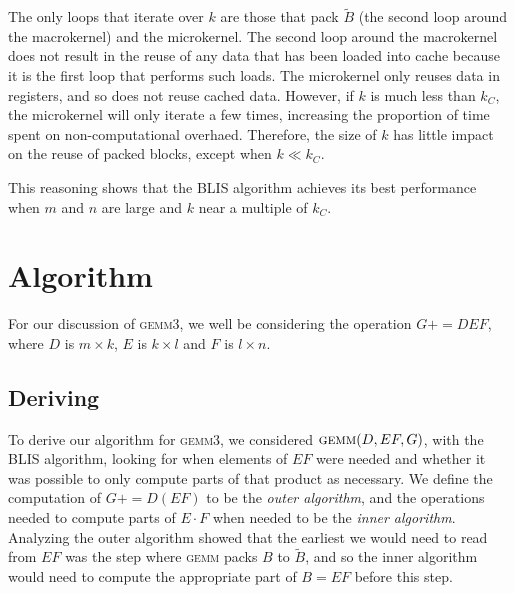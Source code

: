 \documentclass[12pt]{article}
\newcommand*{\pluseq}{\mathrel{{+}{=}}}
\newcommand*{\gemmt}{{\textsc{gemm3}}}
\newcommand*{\gemm}{{\textsc{gemm}}}
\begin{document}
The only loops that iterate over $k$ are those that pack $\widetilde{B}$ (the second loop around the macrokernel) and the microkernel.
The second loop around the macrokernel does not result in the reuse of any data that has been loaded into cache because it is the first loop that performs such loads.
The microkernel only reuses data in registers, and so does not reuse cached data.
However, if $k$ is much less than $k_C$, the microkernel will only iterate a few times, increasing the proportion of time spent on non-computational overhaed.
Therefore, the size of $k$ has little impact on the reuse of packed blocks, except when $k \ll k_C$.

This reasoning shows that the BLIS algorithm achieves its best performance when $m$ and $n$ are large and $k$ near a multiple of $k_C$.

\section{Algorithm}
For our discussion of \gemmt{}, we well be considering the operation $G \pluseq DEF$, where $D$ is $m \times k$, $E$ is $k \times l$ and $F$ is $l \times n$.

\subsection{Deriving {\cmunicode \gemmt{}}}
To derive our algorithm for \gemmt{}, we considered $\gemm{}(D, EF, G)$, with the BLIS algorithm, looking for when elements of $EF$ were needed and whether it was possible to only compute parts of that product as necessary.
We define the computation of $G \pluseq D(EF)$ to be the \emph{outer algorithm}, and the operations needed to compute parts of $E \cdot F$ when needed to be the \emph{inner algorithm}.
Analyzing the outer algorithm showed that the earliest we would need to read from $EF$ was the step where \gemm{} packs $B$ to $\widetilde{B}$, and so the inner algorithm would need to compute the appropriate part of $B = EF$ before this step.
\end{document}
